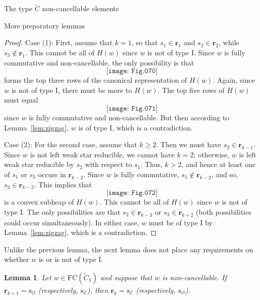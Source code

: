 \documentclass[12pt]{amsart}
\newtheorem{lem}[thm]{Lemma}
\newcommand{\C}{\widetilde{C}}
\renewcommand{\O}{\mathcal{O}}
\newcommand{\E}{\mathcal{E}}
\newcommand{\x}{\mathsf{x}}
\renewcommand{\(}{\left(}
\renewcommand{\)}{\right)}
\newcommand{\FC}{\mathrm{FC}}
\renewcommand{\r}{\mathbf{r}}
\begin{document}
\begin{section}{The type $\C$ non-cancellable elements}
\begin{subsection}{More preparatory lemmas}
\begin{proof}
Case (1):  First, assume that $k=1$, so that $s_{1} \in \r_{1}$ and $s_{2} \in \r_{2}$, while $s_{3} \notin \r_{1}$.  This cannot be all of $H(w)$ since $w$ is not of type I.  Since $w$ is fully commutative and non-cancellable, the only possibility is that 
\[
\texttt{[image: Fig.070]}
\]
forms the top three rows of the canonical representation of $H(w)$.  Again, since $w$ is not of type I, there must be more to $H(w)$.  The top five rows of $H(w)$ must equal
\[
\texttt{[image: Fig.071]}
\]
since $w$ is fully commutative and non-cancellable.  But then according to Lemma~\ref{lem:zigzag}, $w$ is of type I, which is a contradiction.

Case (2):  For the second case, assume that $k\geq 2$.  Then we must have $s_{2} \in \r_{k-1}$.  Since $w$ is not left weak star reducible, we cannot have $k=2$; otherwise, $w$ is left weak star reducible by $s_{2}$ with respect to $s_{1}$.  Thus, $k>2$, and hence at least one of $s_{1}$ or $s_{3}$ occurs in $\r_{k-2}$.  Since $w$ is fully commutative, $s_{1} \notin \r_{k-2}$, and so, $s_{3} \in \r_{k-2}$.  This implies that
\[
\texttt{[image: Fig.072]}
\]
is a convex subheap of $H(w)$.  This cannot be all of $H(w)$ since $w$ is not of type I.  The only possibilities are that $s_{2} \in \r_{k-3}$ or $s_{3} \in \r_{k+2}$ (both possibilities could occur simultaneously).  In either case, $w$ must be of type I by Lemma~\ref{lem:zigzag}, which is a contradiction.
\end{proof}

Unlike the previous lemma, the next lemma does not place any requirements on whether $w$ is or is not of type I.

\begin{lem}\label{lem:sandwich.stack.n=3}
Let $w \in \FC(\C_{3})$ and suppose that $w$ is non-cancellable.  If $\r_{k+1}=\x_{\O}$ (respectively, $\x_{\E}$), then $\r_{k}=\x_{\E}$ (respectively, $\x_{\O}$).
\end{lem}


\end{subsection}
\end{section}
\end{document}
